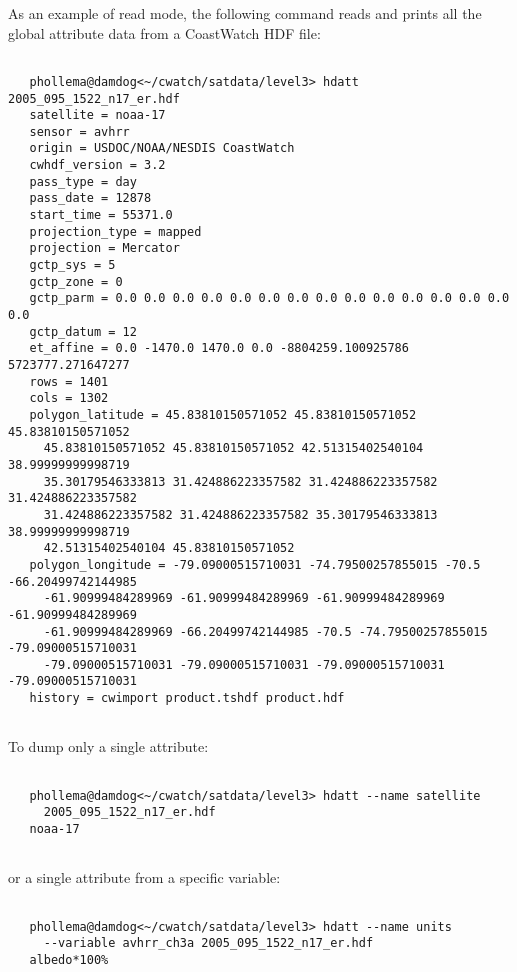  As an example of read mode, the following command reads and prints all the global attribute data from a CoastWatch HDF file: \begin{verbatim}

   phollema@damdog<~/cwatch/satdata/level3> hdatt 2005_095_1522_n17_er.hdf
   satellite = noaa-17
   sensor = avhrr
   origin = USDOC/NOAA/NESDIS CoastWatch
   cwhdf_version = 3.2
   pass_type = day
   pass_date = 12878
   start_time = 55371.0
   projection_type = mapped
   projection = Mercator
   gctp_sys = 5
   gctp_zone = 0
   gctp_parm = 0.0 0.0 0.0 0.0 0.0 0.0 0.0 0.0 0.0 0.0 0.0 0.0 0.0 0.0 0.0
   gctp_datum = 12
   et_affine = 0.0 -1470.0 1470.0 0.0 -8804259.100925786 5723777.271647277
   rows = 1401
   cols = 1302
   polygon_latitude = 45.83810150571052 45.83810150571052 45.83810150571052 
     45.83810150571052 45.83810150571052 42.51315402540104 38.99999999998719 
     35.30179546333813 31.424886223357582 31.424886223357582 31.424886223357582 
     31.424886223357582 31.424886223357582 35.30179546333813 38.99999999998719 
     42.51315402540104 45.83810150571052
   polygon_longitude = -79.09000515710031 -74.79500257855015 -70.5 -66.20499742144985 
     -61.90999484289969 -61.90999484289969 -61.90999484289969 -61.90999484289969 
     -61.90999484289969 -66.20499742144985 -70.5 -74.79500257855015 -79.09000515710031 
     -79.09000515710031 -79.09000515710031 -79.09000515710031 -79.09000515710031
   history = cwimport product.tshdf product.hdf
 
\end{verbatim}
 To dump only a single attribute: \begin{verbatim}

   phollema@damdog<~/cwatch/satdata/level3> hdatt --name satellite 
     2005_095_1522_n17_er.hdf
   noaa-17
 
\end{verbatim}
 or a single attribute from a specific variable: \begin{verbatim}

   phollema@damdog<~/cwatch/satdata/level3> hdatt --name units 
     --variable avhrr_ch3a 2005_095_1522_n17_er.hdf
   albedo*100%
 
\end{verbatim}



